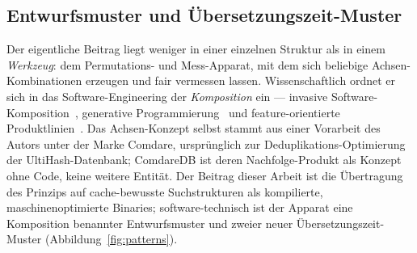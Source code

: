 \begin{nurkurz}
\subsection{Entwurfsmuster und Übersetzungszeit-Muster}\label{sec:anatomy-patterns}
Der eigentliche Beitrag liegt weniger in einer einzelnen Struktur als in einem \emph{Werkzeug}: dem
Permutations- und Mess-Apparat, mit dem sich beliebige Achsen-Kombinationen erzeugen und fair vermessen lassen.
Wissenschaftlich ordnet er sich in das Software-Engineering der \emph{Komposition} ein --- invasive
Software-Komposition~\cite{assmann2003invasive}, generative Programmierung~\cite{czarnecki2000generative} und
feature-orientierte Produktlinien~\cite{apel2013feature,batory1992hierarchical}. Das Achsen-Konzept selbst
stammt aus einer Vorarbeit des Autors unter der Marke Comdare, ursprünglich zur Deduplikations-Optimierung der
UltiHash-Datenbank; ComdareDB ist deren Nachfolge-Produkt als Konzept ohne Code, keine weitere Entität. Der
Beitrag dieser Arbeit ist die Übertragung des Prinzips auf cache-bewusste Suchstrukturen als kompilierte,
maschinenoptimierte Binaries; software-technisch ist der Apparat eine Komposition benannter Entwurfsmuster und
zweier neuer Übersetzungszeit-Muster (Abbildung~\ref{fig:patterns}).
\begin{figure}[htbp]\centering
{}
\end{figure}
\end{nurkurz}
